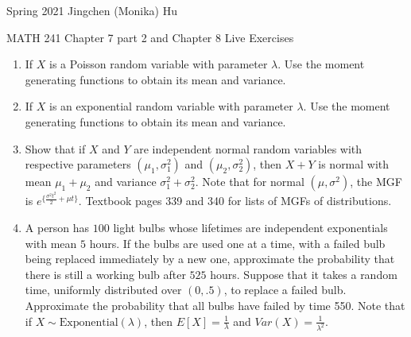 \documentclass[11pt]{article}
\begin{document}
\enlargethispage{\baselineskip}

Spring 2021 \hfill Jingchen (Monika) Hu\\

\begin{center}
{\huge MATH 241 Chapter 7 part 2 and Chapter 8 Live Exercises}	\\
\end{center}
\vspace{0.5cm}

\begin{enumerate}


\item If $X$ is a Poisson random variable with parameter $\lambda$. Use the moment generating functions to obtain its mean and variance.

\item If $X$ is an exponential random variable with parameter $\lambda$. Use the moment generating functions to obtain its mean and variance.

\item Show that if $X$ and $Y$ are independent normal random variables with respective parameters $(\mu_1, \sigma_1^2)$ and $(\mu_2, \sigma_2^2)$, then $X + Y$ is normal with mean $\mu_1 + \mu_2$ and variance $\sigma_1^2 + \sigma_2^2$. Note that for normal $(\mu, \sigma^2)$, the MGF is $e^{\{\frac{\sigma^2t^2}{2} + \mu t\}}$. {\color{red} Textbook pages 339 and 340 for lists of MGFs of distributions.}

\item A person has $100$ light bulbs whose lifetimes are independent exponentials with mean $5$ hours. If the bulbs are used one at a time, with a failed bulb being replaced immediately by a new one, approximate the probability that there is still a working bulb after $525$ hours. Suppose that it takes a random time, uniformly distributed over $(0, .5)$, to replace a failed bulb. Approximate the probability that all bulbs have failed by time 550. Note that if $X \sim \textrm{Exponential}(\lambda)$, then $E[X] = \frac{1}{\lambda}$ and $Var(X) = \frac{1}{\lambda^2}$.

\end{enumerate}
\end{document}

